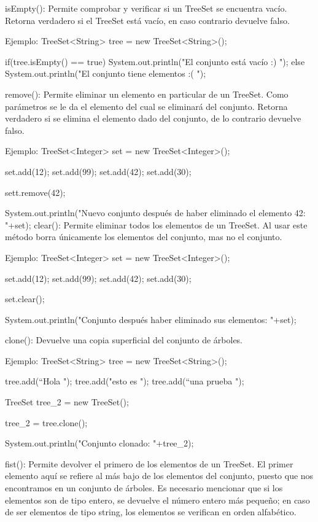 \documentclass[12pt, letterpaper]{article} %
\begin{document}
isEmpty():
Permite comprobar y verificar si un TreeSet se encuentra vacío. Retorna verdadero si el TreeSet está vacío, en caso contrario devuelve falso.

Ejemplo:
TreeSet<String> tree = new TreeSet<String>();

if(tree.isEmpty() == true){
System.out.println("El conjunto está vacío :) ");
}
else{
	System.out.println("El conjunto tiene elementos :( ");
}


remove():
Permite eliminar un elemento en particular de un TreeSet. Como parámetros se le da el elemento del cual se eliminará del conjunto. Retorna verdadero si se elimina el elemento dado del conjunto, de lo contrario devuelve falso.

Ejemplo:
TreeSet<Integer> set = new TreeSet<Integer>();

set.add(12);
set.add(99);
set.add(42);
set.add(30);

sett.remove(42);

System.out.println("Nuevo conjunto después de haber eliminado el elemento 42: "+set);
clear():
Permite eliminar todos los elementos de un TreeSet. Al usar este método borra únicamente los elementos del conjunto, mas no el conjunto.

Ejemplo:
TreeSet<Integer> set = new TreeSet<Integer>();

set.add(12);
set.add(99);
set.add(42);
set.add(30);

set.clear();

System.out.println("Conjunto después haber eliminado sus elementos: "+set);


clone():
Devuelve una copia superficial del conjunto de árboles.

Ejemplo:
TreeSet<String> tree = new TreeSet<String>();

tree.add(“Hola ");
tree.add("esto es ");
tree.add(“una prueba ");

TreeSet tree_2 = new TreeSet();

tree_2 = tree.clone();

System.out.println("Conjunto clonado: "+tree_2);


fist():
Permite devolver el primero de los elementos de un TreeSet. El primer elemento aquí se refiere al más bajo de los elementos del conjunto, puesto que nos encontramos en un conjunto de árboles. Es necesario mencionar que si los elementos son de tipo entero, se devuelve el número entero más pequeño; en caso de ser elementos de tipo string, los elementos se verifican en orden alfabético.
\end{document}

